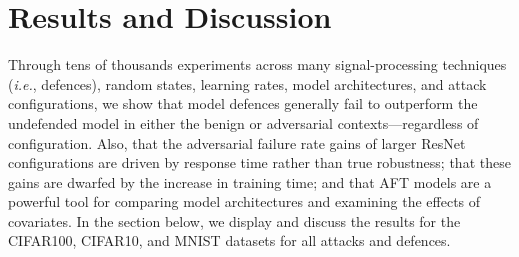\section{Results and Discussion}


Through tens of thousands experiments across many signal-processing techniques (\textit{i.e.}, defences), random states, learning rates, model architectures, and attack configurations, we show that model defences generally fail to outperform the undefended model in either the benign or adversarial contexts---regardless of configuration. 
Also, that the adversarial failure rate gains of larger ResNet configurations are driven by response time rather than true robustness; that these gains are dwarfed by the increase in training time; and that AFT models are a powerful tool for comparing model architectures and examining the effects of covariates. 
In the section below, we display and discuss the results for the CIFAR100, CIFAR10, and MNIST datasets for all attacks and defences.



